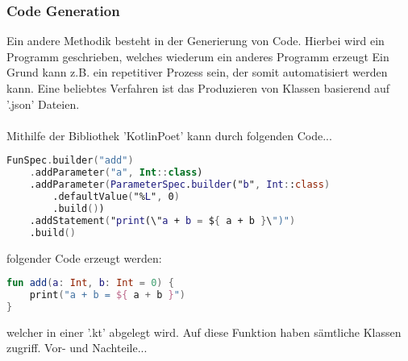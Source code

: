 \subsubsection{Code Generation}
Ein andere Methodik besteht in der Generierung von Code. Hierbei wird ein Programm geschrieben, welches wiederum ein anderes Programm erzeugt Ein Grund kann z.B. ein repetitiver Prozess sein, der somit automatisiert werden kann. Eine beliebtes Verfahren ist das Produzieren von Klassen basierend auf '.json' Dateien.
\\
\\
Mithilfe der Bibliothek 'KotlinPoet' kann durch folgenden Code...
\begin{lstlisting}[caption={Code zum erezugen einer Funktion}, label={lst:data-class}, language=Kotlin]
FunSpec.builder("add")
	.addParameter("a", Int::class)
	.addParameter(ParameterSpec.builder("b", Int::class)
		.defaultValue("%L", 0)
		.build())
	.addStatement("print(\"a + b = ${ a + b }\")")
	.build()
\end{lstlisting}
\bigskip
folgender Code erzeugt werden:
\begin{lstlisting}[caption={Erzeugte Funktionen}, label={lst:data-class}, language=Kotlin]
fun add(a: Int, b: Int = 0) {
	print("a + b = ${ a + b }")
}
\end{lstlisting}
welcher in einer '.kt' abgelegt wird. Auf diese Funktion haben sämtliche Klassen zugriff.
Vor- und Nachteile...
 
